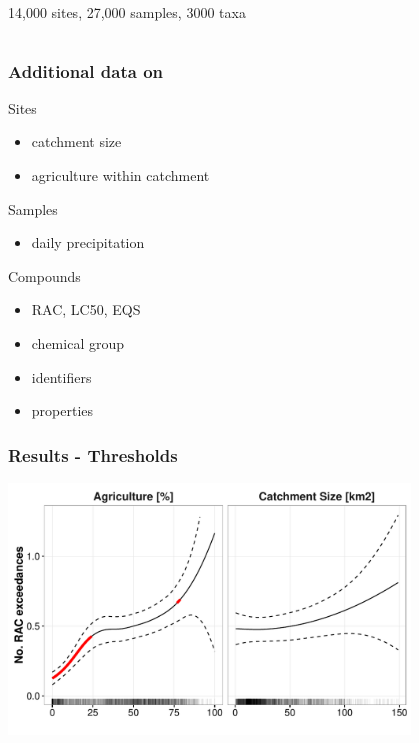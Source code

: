 \documentclass[12pt
, t
]{beamer}
\begin{document}
\begin{frame}
\begin{columns}[t]
	14,000 sites, 27,000 samples, 3000 taxa
	\end{columns}
\end{frame}


\begin{frame}
\frametitle{Additional data on}
\textcolor{hilight}{Sites}
\begin{itemize}
\item catchment size
\item agriculture within catchment
\end{itemize}

\pause
\textcolor{hilight}{Samples}
\begin{itemize}
\item daily precipitation
\end{itemize}

\pause
\textcolor{hilight}{Compounds}
\begin{itemize}
\item RAC, LC50, EQS
\item chemical group
\item identifiers
\item properties
\end{itemize}
\end{frame}



\begin{frame}
\frametitle{Results - Thresholds}
\pause
\begin{center}
	\includegraphics[width = 0.8\textwidth]{fig/figure4.pdf}
\end{center}
\end{frame}
\end{document}
